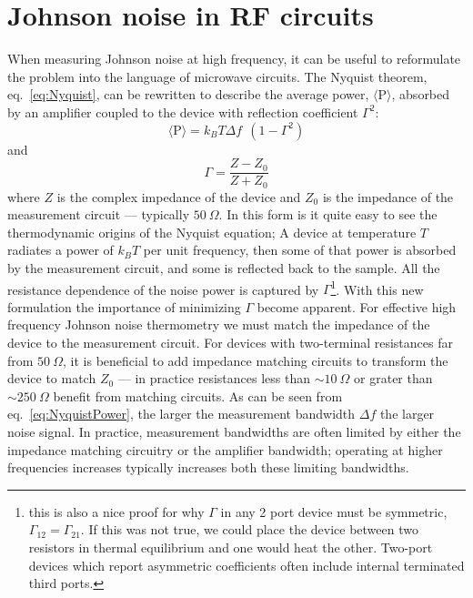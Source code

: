 \section{Johnson noise in RF circuits}
When measuring Johnson noise at high frequency, it can be useful to reformulate the problem into the language of microwave circuits. The Nyquist theorem, eq.~\ref{eq:Nyquist}, can be rewritten to describe the average power, $\langle\mathrm{P}\rangle$, absorbed by an amplifier coupled to the device with reflection coefficient $\Gamma^2$:
\begin{equation}\label{eq:NyquistPower}
\langle\mathrm{P}\rangle = k_BT\Delta f~~(1-\Gamma^2)
\end{equation}
and
\begin{equation}\label{eq:Gamma}
\Gamma = \frac{Z-Z_0}{Z+Z_0}
\end{equation}
where $Z$ is the complex impedance of the device and $Z_0$ is the impedance of the measurement circuit --- typically $50~\Omega$. In this form is it quite easy to see the thermodynamic origins of the Nyquist equation; A device at temperature $T$ radiates a power of $k_BT$ per unit frequency, then some of that power is absorbed by the measurement circuit, and some is reflected back to the sample. All the resistance dependence of the noise power is captured by $\Gamma$\footnote{this is also a nice proof for why $\Gamma$ in any 2 port device must be symmetric, $\Gamma_{12}=\Gamma_{21}$. If this was not true, we could place the device between two resistors in thermal equilibrium and one would heat the other. Two-port devices which report asymmetric coefficients often include internal terminated third ports.}.
With this new formulation the importance of minimizing $\Gamma$ become apparent. For effective high frequency Johnson noise thermometry we must match the impedance of the device to the measurement circuit. For devices with two-terminal resistances far from $50~\Omega$, it is beneficial to add impedance matching circuits to transform the device to match $Z_0$ --- in practice resistances less than $\sim 10~\Omega$ or grater than $\sim 250~\Omega$ benefit from matching circuits.
As can be seen from eq.~\ref{eq:NyquistPower}, the larger the measurement bandwidth $\Delta f$ the larger noise signal. In practice, measurement bandwidths are often limited by either the impedance matching circuitry or the amplifier bandwidth; operating at higher frequencies increases typically increases both these limiting bandwidths.


